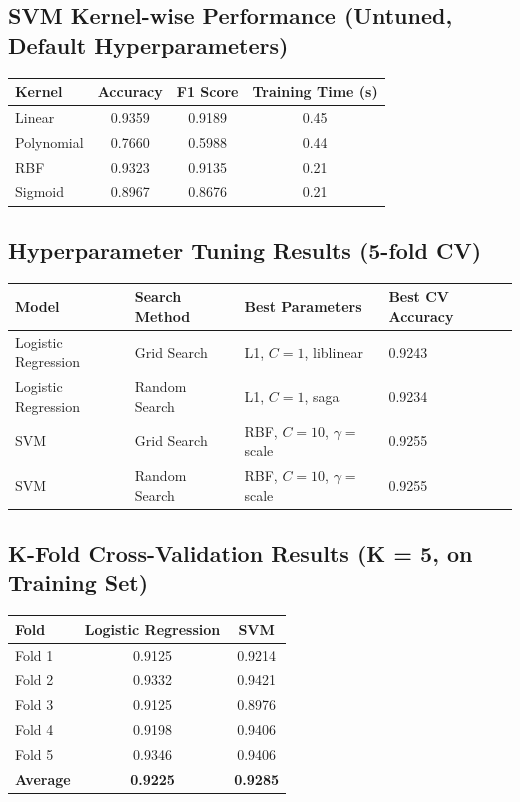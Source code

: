 \documentclass[12pt,a4paper]{article}
\begin{document}
\subsection*{SVM Kernel-wise Performance (Untuned, Default Hyperparameters)}
\begin{tabular}{lccc}
\toprule
Kernel & Accuracy & F1 Score & Training Time (s)\\
\midrule
Linear   & 0.9359 & 0.9189 & 0.45 \\
Polynomial & 0.7660 & 0.5988 & 0.44 \\
RBF      & 0.9323 & 0.9135 & 0.21 \\
Sigmoid  & 0.8967 & 0.8676 & 0.21 \\
\bottomrule
\end{tabular}

\subsection*{Hyperparameter Tuning Results (5-fold CV)}
\begin{tabular}{llll}
\toprule
Model & Search Method & Best Parameters & Best CV Accuracy\\
\midrule
Logistic Regression & Grid Search & L1, $C{=}1$, liblinear & 0.9243 \\
Logistic Regression & Random Search & L1, $C{=}1$, saga & 0.9234 \\
SVM & Grid Search & RBF, $C{=}10$, $\gamma{=}$scale & 0.9255 \\
SVM & Random Search & RBF, $C{=}10$, $\gamma{=}$scale & 0.9255 \\
\bottomrule
\end{tabular}

\subsection*{K-Fold Cross-Validation Results (K = 5, on Training Set)}
\begin{tabular}{lcc}
\toprule
Fold & Logistic Regression & SVM\\
\midrule
Fold 1  & 0.9125 & 0.9214 \\
Fold 2  & 0.9332 & 0.9421 \\
Fold 3  & 0.9125 & 0.8976 \\
Fold 4  & 0.9198 & 0.9406 \\
Fold 5  & 0.9346 & 0.9406 \\
\midrule
\textbf{Average} & \textbf{0.9225} & \textbf{0.9285} \\
\bottomrule
\end{tabular}
\end{document}
